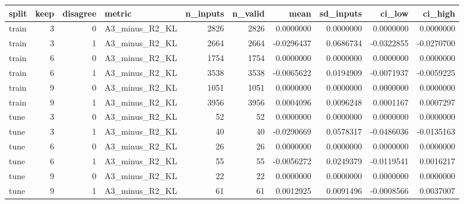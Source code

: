 \begin{tabular}{lrrlrrrrrr}
\toprule
split & keep & disagree & metric & n_inputs & n_valid & mean & sd_inputs & ci_low & ci_high \\
\midrule
train & 3 & 0 & A3_minus_R2_KL & 2826 & 2826 & 0.0000000 & 0.0000000 & 0.0000000 & 0.0000000 \\
train & 3 & 1 & A3_minus_R2_KL & 2664 & 2664 & -0.0296437 & 0.0686734 & -0.0322855 & -0.0270700 \\
train & 6 & 0 & A3_minus_R2_KL & 1754 & 1754 & 0.0000000 & 0.0000000 & 0.0000000 & 0.0000000 \\
train & 6 & 1 & A3_minus_R2_KL & 3538 & 3538 & -0.0065622 & 0.0194909 & -0.0071937 & -0.0059225 \\
train & 9 & 0 & A3_minus_R2_KL & 1051 & 1051 & 0.0000000 & 0.0000000 & 0.0000000 & 0.0000000 \\
train & 9 & 1 & A3_minus_R2_KL & 3956 & 3956 & 0.0004096 & 0.0096248 & 0.0001167 & 0.0007297 \\
tune & 3 & 0 & A3_minus_R2_KL & 52 & 52 & 0.0000000 & 0.0000000 & 0.0000000 & 0.0000000 \\
tune & 3 & 1 & A3_minus_R2_KL & 40 & 40 & -0.0290669 & 0.0578317 & -0.0486036 & -0.0135163 \\
tune & 6 & 0 & A3_minus_R2_KL & 26 & 26 & 0.0000000 & 0.0000000 & 0.0000000 & 0.0000000 \\
tune & 6 & 1 & A3_minus_R2_KL & 55 & 55 & -0.0056272 & 0.0249379 & -0.0119541 & 0.0016217 \\
tune & 9 & 0 & A3_minus_R2_KL & 22 & 22 & 0.0000000 & 0.0000000 & 0.0000000 & 0.0000000 \\
tune & 9 & 1 & A3_minus_R2_KL & 61 & 61 & 0.0012925 & 0.0091496 & -0.0008566 & 0.0037007 \\
\bottomrule
\end{tabular}
